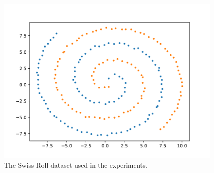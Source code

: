\begin{figure}
	\centering
	\includegraphics[scale=0.7]{figures/dataset.pdf}
	\caption{The Swiss Roll dataset used in the experiments.}
	\label{fig:dataset}
\end{figure}